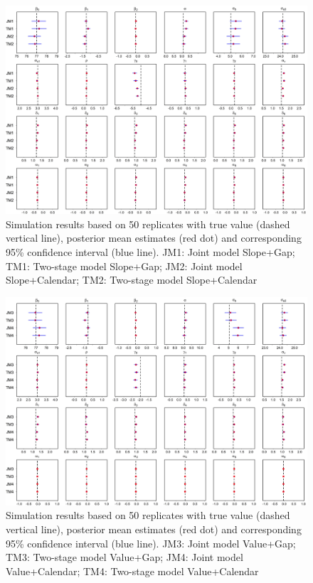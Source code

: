 \begin{figure}[ht] 
\includegraphics[width=\textwidth]{Figures/Chp3_sim_1.jpg} 
\caption{Simulation results based on 50 replicates with true value (dashed vertical line), posterior mean estimates (red dot) and corresponding 95\% confidence interval (blue line). JM1: Joint model Slope+Gap; TM1: Two-stage model Slope+Gap; JM2: Joint model Slope+Calendar; TM2: Two-stage model Slope+Calendar}
\label{fig:chp3_est1}
\end{figure}

\begin{figure}[ht] 
\includegraphics[width=\textwidth]{Figures/Chp3_sim_2.jpg}
\caption{Simulation results based on 50 replicates with true value (dashed vertical line), posterior mean estimates (red dot) and corresponding 95\% confidence interval (blue line). JM3: Joint model Value+Gap; TM3: Two-stage model Value+Gap; JM4: Joint model Value+Calendar; TM4: Two-stage model Value+Calendar}
\label{fig:chp3_est2}
\end{figure}

